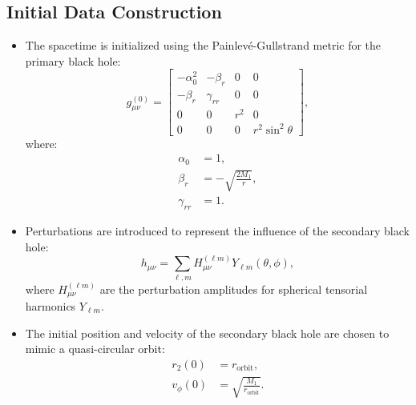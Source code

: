 \documentclass[12pt]{article}
\begin{document}
\subsection{Initial Data Construction}
\begin{itemize}
    \item The spacetime is initialized using the Painlevé-Gullstrand metric for the primary black hole:
    \[
    g_{\mu\nu}^{(0)} = 
    \begin{bmatrix}
    -\alpha_0^2 & -\beta_r & 0 & 0 \\
    -\beta_r & \gamma_{rr} & 0 & 0 \\
    0 & 0 & r^2 & 0 \\
    0 & 0 & 0 & r^2 \sin^2\theta
    \end{bmatrix},
    \]
    where:
    \begin{align*}
        \alpha_0 &= 1, \\
        \beta_r &= -\sqrt{\frac{2M_1}{r}}, \\
        \gamma_{rr} &= 1.
    \end{align*}
    \item Perturbations are introduced to represent the influence of the secondary black hole:
    \[
    h_{\mu\nu} = \sum_{\ell,m} H_{\mu\nu}^{(\ell m)} Y_{\ell m}(\theta, \phi),
    \]
    where $H_{\mu\nu}^{(\ell m)}$ are the perturbation amplitudes for spherical tensorial harmonics $Y_{\ell m}$.
    \item The initial position and velocity of the secondary black hole are chosen to mimic a quasi-circular orbit:
    \begin{align*}
        r_2(0) &= r_{\text{orbit}}, \\
        v_\phi(0) &= \sqrt{\frac{M_1}{r_{\text{orbit}}}}.
    \end{align*}
\end{itemize}
\end{document}
